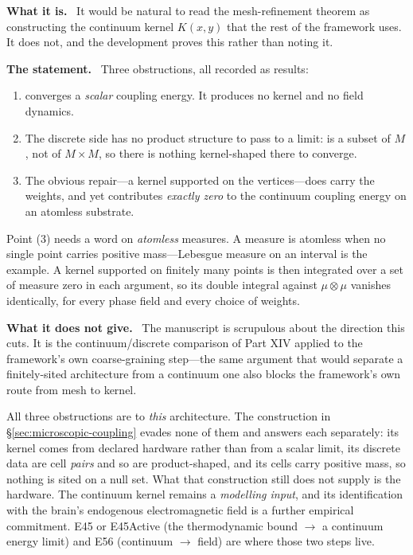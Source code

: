 \documentclass[11pt]{article}
\newcommand{\what}{\par\smallskip\noindent\textbf{What it is.}\ }
\newcommand{\statement}{\par\smallskip\noindent\textbf{The statement.}\ }
\newcommand{\scope}{\par\smallskip\noindent\textbf{What it does not give.}\ }
\newcommand{\id}[1]{{\small\ttfamily\seqsplit{#1}}}
\begin{document}
\what
It would be natural to read the mesh-refinement theorem as constructing the
continuum kernel $K(x,y)$ that the rest of the framework uses. It does not,
and the development proves this rather than noting it.

\statement
Three obstructions, all recorded as results:
\begin{enumerate}[leftmargin=*,noitemsep]
\item \id{mesh\_refinement\_convergence} converges a \emph{scalar} coupling
energy. It produces no kernel and no field dynamics.
\item The discrete side has no product structure to pass to a limit:
\id{edge\_region} is a subset of $M$, not of $M\times M$, so there is nothing
kernel-shaped there to converge.
\item The obvious repair---a kernel supported on the vertices---does carry the
weights, and yet contributes \emph{exactly zero} to the continuum coupling
energy on an atomless substrate.
\end{enumerate}
Point (3) needs a word on \emph{atomless} measures. A measure is atomless when
no single point carries positive mass---Lebesgue measure on an interval is the
example. A kernel supported on finitely many points is then integrated over a
set of measure zero in each argument, so its double integral against
$\mu\otimes\mu$ vanishes identically, for every phase field and every choice of
weights.

\scope
The manuscript is scrupulous about the direction this cuts. It is
the continuum/discrete comparison of Part XIV applied to the framework's own
coarse-graining step---the same argument that would separate a finitely-sited
architecture from a continuum one also blocks the framework's own route from
mesh to kernel.

All three obstructions are to \emph{this} architecture. The construction in
\S\ref{sec:microscopic-coupling} evades none of them and answers each
separately: its kernel comes from declared hardware rather than from a scalar
limit, its discrete data are cell \emph{pairs} and so are product-shaped, and
its cells carry positive mass, so nothing is sited on a null set. What that
construction still does not supply is the hardware. The continuum kernel
remains a \emph{modelling input}, and its identification with the brain's
endogenous electromagnetic field is a further empirical commitment. E45 or
E45Active (the thermodynamic bound $\to$ a continuum energy limit) and E56
(continuum $\to$ field) are where those two steps live.
\end{document}
